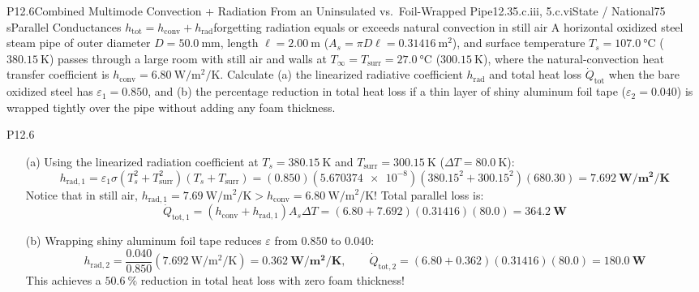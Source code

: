 \begin{problem}{P12.6}{Combined Multimode Convection + Radiation From an Uninsulated vs.\ Foil-Wrapped Pipe}{12.3}{5.c.iii, 5.c.vi}{State / National}{75 s}{Parallel Conductances $h_{\mathrm{tot}} = h_{\mathrm{conv}} + h_{\mathrm{rad}}$}{forgetting radiation equals or exceeds natural convection in still air}
A horizontal oxidized steel steam pipe of outer diameter $D = \SI{50.0}{\milli\meter}$, length $\ell = \SI{2.00}{\meter}$ ($A_s = \pi D\ell = \SI{0.31416}{\square\meter}$), and surface temperature $T_s = \SI{107.0}{\celsius}$ ($\SI{380.15}{\kelvin}$) passes through a large room with still air and walls at $T_\infty = T_{\mathrm{surr}} = \SI{27.0}{\celsius}$ ($\SI{300.15}{\kelvin}$), where the natural-convection heat transfer coefficient is $h_{\mathrm{conv}} = \SI{6.80}{\watt\per\square\meter\per\kelvin}$. Calculate (a) the linearized radiative coefficient $h_{\mathrm{rad}}$ and total heat loss $\dot{Q}_{\mathrm{tot}}$ when the bare oxidized steel has $\varepsilon_1 = 0.850$, and (b) the percentage reduction in total heat loss if a thin layer of shiny aluminum foil tape ($\varepsilon_2 = 0.040$) is wrapped tightly over the pipe without adding any foam thickness.
\end{problem}
\begin{solution}{P12.6}
\begin{enumerate}
  \item[(a)] Using the linearized radiation coefficient at $T_s = \SI{380.15}{\kelvin}$ and $T_{\mathrm{surr}} = \SI{300.15}{\kelvin}$ ($\Delta T = \SI{80.0}{\kelvin}$):
  \[
    h_{\mathrm{rad},1} = \varepsilon_1 \sigma\left(T_s^2 + T_{\mathrm{surr}}^2\right)\left(T_s + T_{\mathrm{surr}}\right) = (0.850)(\num{5.670374e-8})\left(380.15^2 + 300.15^2\right)(680.30) = \mathbf{\SI{7.692}{\watt\per\square\meter\per\kelvin}}
  \]
  Notice that in still air, $h_{\mathrm{rad},1} = \SI{7.69}{\watt\per\square\meter\per\kelvin} > h_{\mathrm{conv}} = \SI{6.80}{\watt\per\square\meter\per\kelvin}$! Total parallel loss is:
  \[
    \dot{Q}_{\mathrm{tot},1} = \left(h_{\mathrm{conv}} + h_{\mathrm{rad},1}\right)A_s\Delta T = (6.80 + 7.692)(0.31416)(80.0) = \mathbf{\SI{364.2}{\watt}}
  \]
  \item[(b)] Wrapping shiny aluminum foil tape reduces $\varepsilon$ from $0.850$ to $0.040$:
  \[
    h_{\mathrm{rad},2} = \frac{0.040}{0.850}(\SI{7.692}{\watt\per\square\meter\per\kelvin}) = \mathbf{\SI{0.362}{\watt\per\square\meter\per\kelvin}}, \qquad
    \dot{Q}_{\mathrm{tot},2} = (6.80 + 0.362)(0.31416)(80.0) = \mathbf{\SI{180.0}{\watt}}
  \]
  This achieves a $\mathbf{\SI{50.6}{\percent}}$ reduction in total heat loss with zero foam thickness!
\end{enumerate}
\end{solution}

